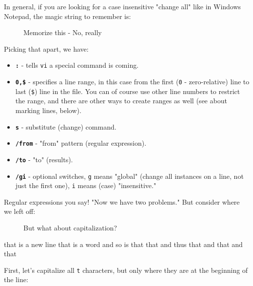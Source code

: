 \documentclass[10pt,american,]{book}
\newenvironment{Shaded}{\begin{snugshade}}{\end{snugshade}}
\newcommand{\KeywordTok}[1]{\textcolor[rgb]{0.13,0.29,0.53}{\textbf{{#1}}}}
\newcommand{\OtherTok}[1]{\textcolor[rgb]{0.56,0.35,0.01}{{#1}}}
\newcommand{\NormalTok}[1]{{#1}}
\numberwithin{figure}{chapter}
\DeclareRobustCommand{\drcap}[1]{\begin{figure}[H]\caption{#1}\end{figure}}
\renewcommand{\KeywordTok}[1]{{#1}}
\renewcommand{\OtherTok}[1]{{#1}}
\renewcommand{\NormalTok}[1]{{#1}}
\begin{document}
In general, if you are looking for a case insensitive "change all" like
in Windows Notepad, the magic string to remember is:

\drcap{Memorize this - No, really}

\begin{Shaded}
\end{Shaded}

Picking that apart, we have:

\begin{itemize}
\item
  \textbf{\texttt{:}} - tells \texttt{vi} a special command is coming.
\item
  \textbf{\texttt{0,\$}} - specifies a line range, in this case from the
  first (\texttt{0} - zero-relative) line to last (\texttt{\$}) line in
  the file. You can of course use other line numbers to restrict the
  range, and there are other ways to create ranges as well (see about
  marking lines, below).
\item
  \textbf{\texttt{s}} - substitute (change) command.
\item
  \textbf{\texttt{/from}} - "from" pattern (regular expression).
\item
  \textbf{\texttt{/to}} - "to" (results).
\item
  \textbf{\texttt{/gi}} - optional switches, \texttt{g} means "global"
  (change all instances on a line, not just the first one), \texttt{i}
  means (case) "insensitive."
\end{itemize}

Regular expressions you say! "Now we have two problems." But consider
where we left off: 

\drcap{But what about capitalization?}

\begin{Shaded}
\begin{Highlighting}[]
\KeywordTok{that} \NormalTok{is a new line}
\KeywordTok{that} \NormalTok{is a word}
\KeywordTok{and} \NormalTok{so is that}
\KeywordTok{that} \NormalTok{and thus}
\KeywordTok{that} \NormalTok{and that and that}
\end{Highlighting}
\end{Shaded}

First, let's capitalize all \texttt{t} characters, but only where they
are at the beginning of the line:
\end{document}
